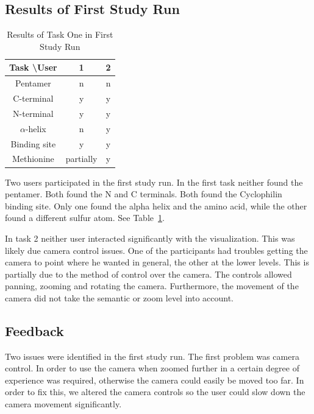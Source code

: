 \documentclass[review,journal]{vgtc}         %
\begin{document}
	\subsection{Results of First Study Run}
	\begin{table}
		\caption{Results of Task One in First Study Run}
		
		\centering
		\begin{tabular}{| c | c | c |}
			\hline
			Task \textbackslash User & 1 & 2  \\
			\hline
			Pentamer       & n & n \\
			\hline
			C-terminal     & y & y \\
			\hline
			N-terminal     & y & y \\
			\hline
			$\alpha$-helix & n & y \\
			\hline
			Binding site   & y & y\\
			\hline
			Methionine      & partially & y \\
			\hline
		\end{tabular}
		\label{tableIterationOne}
	\end{table}
	
	
	Two users participated in the first study run. 
	In the first task neither found the pentamer. 
	Both found the N and C terminals. 
	Both found the Cyclophilin binding site. 
	Only one found the alpha helix and the amino acid, while the other found a different sulfur atom.
	See Table~\ref{tableIterationOne}.
	
	In task 2 neither user interacted significantly with the visualization. This was likely due camera control issues. 
	One of the participants had troubles getting the camera to point where he wanted in general, the other at the lower levels.
	This is partially due to the method of control over the camera. 
	The controls allowed panning, zooming and rotating the camera. 
	Furthermore, the movement of the camera did not take the semantic or zoom level into account.
	
	\subsection{Feedback}
	Two issues were identified in the first study run. 
	The first problem was camera control. 
	In order to use the camera when zoomed further in a certain degree of experience was required, otherwise the camera could easily be moved too far.
	In order to fix this, we altered the camera controls so the user could slow down the camera movement significantly.
	
\end{document}
